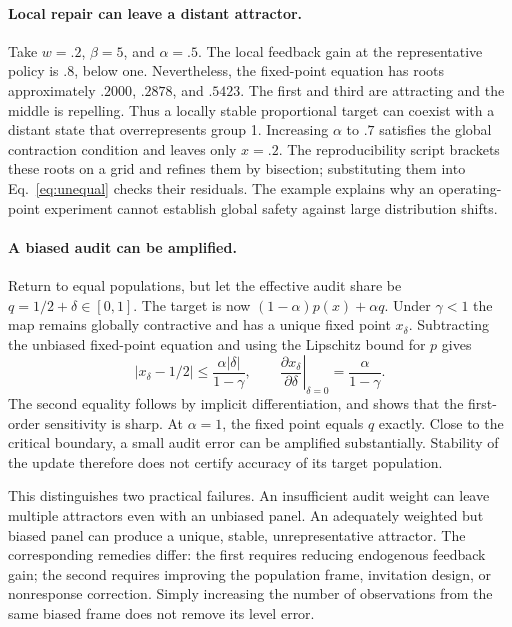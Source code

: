 \documentclass{article}
\begin{document}
\paragraph{Local repair can leave a distant attractor.}
Take $w=.2$, $\beta=5$, and $\alpha=.5$. The local feedback gain at the representative policy is $.8$, below one. Nevertheless, the fixed-point equation has roots approximately $.2000$, $.2878$, and $.5423$. The first and third are attracting and the middle is repelling. Thus a locally stable proportional target can coexist with a distant state that overrepresents group 1. Increasing $\alpha$ to $.7$ satisfies the global contraction condition and leaves only $x=.2$. The reproducibility script brackets these roots on a grid and refines them by bisection; substituting them into Eq.~\eqref{eq:unequal} checks their residuals. The example explains why an operating-point experiment cannot establish global safety against large distribution shifts.

\paragraph{A biased audit can be amplified.}
Return to equal populations, but let the effective audit share be $q=1/2+\delta\in[0,1]$. The target is now $(1-\alpha)p(x)+\alpha q$. Under $\gamma<1$ the map remains globally contractive and has a unique fixed point $x_\delta$. Subtracting the unbiased fixed-point equation and using the Lipschitz bound for $p$ gives
\begin{equation}
|x_\delta-1/2|\le \frac{\alpha|\delta|}{1-\gamma},\qquad
\left.\frac{\partial x_\delta}{\partial\delta}\right|_{\delta=0}
=\frac{\alpha}{1-\gamma}.
\label{eq:bias}
\end{equation}
The second equality follows by implicit differentiation, and shows that the first-order sensitivity is sharp. At $\alpha=1$, the fixed point equals $q$ exactly. Close to the critical boundary, a small audit error can be amplified substantially. Stability of the update therefore does not certify accuracy of its target population.

This distinguishes two practical failures. An insufficient audit weight can leave multiple attractors even with an unbiased panel. An adequately weighted but biased panel can produce a unique, stable, unrepresentative attractor. The corresponding remedies differ: the first requires reducing endogenous feedback gain; the second requires improving the population frame, invitation design, or nonresponse correction. Simply increasing the number of observations from the same biased frame does not remove its level error.
\end{document}
